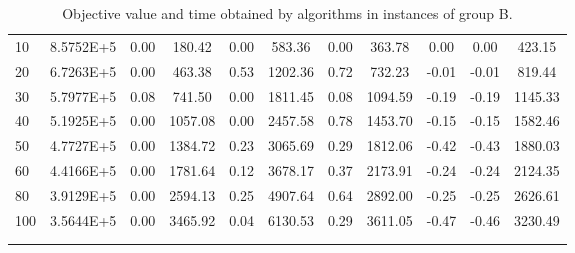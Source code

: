 {\begin{longtable}{@{}llccccccccc@{}}
\multicolumn{1}{l|}{10}  & \multicolumn{1}{l|}{8.5752E+5}  & 0.00 & \multicolumn{1}{c|}{180.42}  & 0.00 & \multicolumn{1}{c|}{583.36}  & 0.00 & \multicolumn{1}{c|}{363.78}  & 0.00      & 0.00      & 423.15  \\
\multicolumn{1}{l|}{20}  & \multicolumn{1}{l|}{6.7263E+5}  & 0.00 & \multicolumn{1}{c|}{463.38}  & 0.53 & \multicolumn{1}{c|}{1202.36} & 0.72 & \multicolumn{1}{c|}{732.23}  & -0.01     & -0.01     & 819.44  \\
\multicolumn{1}{l|}{30}  & \multicolumn{1}{l|}{5.7977E+5}  & 0.08 & \multicolumn{1}{c|}{741.50}  & 0.00 & \multicolumn{1}{c|}{1811.45} & 0.08 & \multicolumn{1}{c|}{1094.59} & -0.19     & -0.19     & 1145.33 \\
\multicolumn{1}{l|}{40}  & \multicolumn{1}{l|}{5.1925E+5}  & 0.00 & \multicolumn{1}{c|}{1057.08} & 0.00 & \multicolumn{1}{c|}{2457.58} & 0.78 & \multicolumn{1}{c|}{1453.70} & -0.15     & -0.15     & 1582.46 \\
\multicolumn{1}{l|}{50}  & \multicolumn{1}{l|}{4.7727E+5}  & 0.00 & \multicolumn{1}{c|}{1384.72} & 0.23 & \multicolumn{1}{c|}{3065.69} & 0.29 & \multicolumn{1}{c|}{1812.06} & -0.42     & -0.43     & 1880.03 \\
\multicolumn{1}{l|}{60}  & \multicolumn{1}{l|}{4.4166E+5}  & 0.00 & \multicolumn{1}{c|}{1781.64} & 0.12 & \multicolumn{1}{c|}{3678.17} & 0.37 & \multicolumn{1}{c|}{2173.91} & -0.24     & -0.24     & 2124.35 \\
\multicolumn{1}{l|}{80}  & \multicolumn{1}{l|}{3.9129E+5}  & 0.00 & \multicolumn{1}{c|}{2594.13} & 0.25 & \multicolumn{1}{c|}{4907.64} & 0.64 & \multicolumn{1}{c|}{2892.00} & -0.25     & -0.25     & 2626.61 \\
\multicolumn{1}{l|}{100} & \multicolumn{1}{l|}{3.5644E+5}  & 0.00 & \multicolumn{1}{c|}{3465.92} & 0.04 & \multicolumn{1}{c|}{6130.53} & 0.29 & \multicolumn{1}{c|}{3611.05} & -0.47     & -0.46     & 3230.49 \\ \hline
\caption{Objective value and time obtained by algorithms in instances of group B.}\\
\label{results-all-B}\\
\end{longtable}}